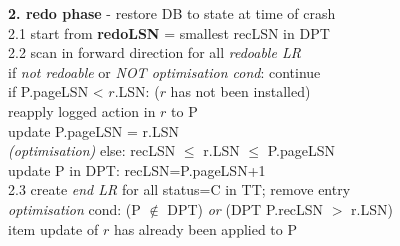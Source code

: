 \documentclass[10pt, landscape]{article}
\begin{document}
\begin{multicols*}{3}
\smallskip
\textbf{2. redo phase} - restore DB to state at time of crash \\
2.1 start from \textbf{redoLSN} = smallest recLSN in DPT \\
2.2 scan in forward direction for all \textit{redoable LR} \\
\hspace{10mm} if \textit{not redoable} or \textit{NOT optimisation cond}: continue \\
\hspace{10mm} if P.pageLSN < $r$.LSN: ($r$ has not been installed) \\
	\hspace{15mm} reapply logged action in $r$ to P\\
	\hspace{15mm} update P.pageLSN = r.LSN\\
\hspace{10mm} \textit{(optimisation)} else: recLSN $\leq$ r.LSN $\leq$ P.pageLSN\\
	\hspace{15mm} update P in DPT: recLSN=P.pageLSN+1 \\
2.3 create \textit{end LR} for all status=C in TT; remove entry\\
\hspace{10mm} \textit{optimisation} cond: (P $\not\in$ DPT) \textit{or} (DPT P.recLSN $>$ r.LSN)\\
	\hspace{15mm} item update of $r$ has already been applied to P


\end{multicols*}
\end{document}
